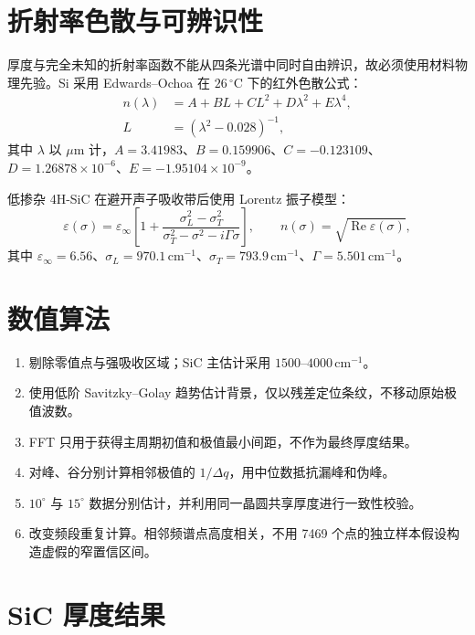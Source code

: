 \documentclass[UTF8,zihao=-4]{ctexart}
\begin{document}
\section{折射率色散与可辨识性}

厚度与完全未知的折射率函数不能从四条光谱中同时自由辨识，故必须使用材料物理先验。Si 采用 Edwards--Ochoa 在 $26\,^{\circ}\mathrm C$ 下的红外色散公式：
\begin{align}
n(\lambda)&=A+BL+CL^2+D\lambda^2+E\lambda^4,\\
L&=(\lambda^2-0.028)^{-1},
\end{align}
其中 $\lambda$ 以 $\mu\mathrm m$ 计，$A=3.41983$、$B=0.159906$、$C=-0.123109$、$D=1.26878\times10^{-6}$、$E=-1.95104\times10^{-9}$。

低掺杂 4H-SiC 在避开声子吸收带后使用 Lorentz 振子模型：
\begin{equation}
\varepsilon(\sigma)=\varepsilon_\infty\left[1+
\frac{\sigma_L^2-\sigma_T^2}{\sigma_T^2-\sigma^2-i\Gamma\sigma}\right],
\qquad n(\sigma)=\sqrt{\operatorname{Re}\varepsilon(\sigma)},
\end{equation}
其中 $\varepsilon_\infty=6.56$、$\sigma_L=970.1\,\mathrm{cm^{-1}}$、$\sigma_T=793.9\,\mathrm{cm^{-1}}$、$\Gamma=5.501\,\mathrm{cm^{-1}}$。

\section{数值算法}

\begin{enumerate}
  \item 剔除零值点与强吸收区域；SiC 主估计采用 $1500$--$4000\,\mathrm{cm^{-1}}$。
  \item 使用低阶 Savitzky--Golay 趋势估计背景，仅以残差定位条纹，不移动原始极值波数。
  \item FFT 只用于获得主周期初值和极值最小间距，不作为最终厚度结果。
  \item 对峰、谷分别计算相邻极值的 $1/\Delta q$，用中位数抵抗漏峰和伪峰。
  \item $10^\circ$ 与 $15^\circ$ 数据分别估计，并利用同一晶圆共享厚度进行一致性校验。
  \item 改变频段重复计算。相邻频谱点高度相关，不用 7469 个点的独立样本假设构造虚假的窄置信区间。
\end{enumerate}

\section{SiC 厚度结果}
\end{document}
